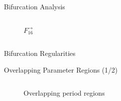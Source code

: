 \begin{frame}{Bifurcation Analysis}
\begin{columns}
\begin{column}{.5 \textwidth}
\begin{figure}
{					\caption*{$F_{16}^\rightarrow$}
				}
			\end{figure}
		\end{column}
	\end{columns}
\end{frame}

\begin{frame}{Bifurcation Regularities}
\end{frame}

\begin{frame}{Overlapping Parameter Regions (1/2)}
	\vspace{-1em}
	\begin{columns}
		\begin{column}{.8 \textwidth}
			\vspace{-3em}
			\begin{figure}
				\centering
				\caption*{Overlapping period regions}
			\end{figure}
		\end{column}
		\begin{column}{.2 \textwidth}
			\vspace{-4em}
			\begin{figure}
			\end{figure}
		\end{column}
	\end{columns}
\end{frame}

